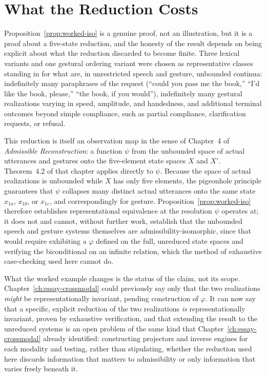 \section{What the Reduction Costs}

Proposition~\ref{prop:worked-iso} is a genuine proof, not an illustration, but it is a proof about a five-state reduction, and the honesty of the result depends on being explicit about what the reduction discarded to become finite. Three lexical variants and one gestural ordering variant were chosen as representative classes standing in for what are, in unrestricted speech and gesture, unbounded continua: indefinitely many paraphrases of the request (``could you pass me the book,'' ``I'd like the book, please,'' ``the book, if you would''), indefinitely many gestural realizations varying in speed, amplitude, and handedness, and additional terminal outcomes beyond simple compliance, such as partial compliance, clarification requests, or refusal.

This reduction is itself an observation map in the sense of Chapter~4 of \emph{Admissible Reconstruction}: a function $\psi$ from the unbounded space of actual utterances and gestures onto the five-element state spaces $X$ and $X'$. Theorem~4.2 of that chapter applies directly to $\psi$. Because the space of actual realizations is unbounded while $X$ has only five elements, the pigeonhole principle guarantees that $\psi$ collapses many distinct actual utterances onto the same state $x_{1a}$, $x_{1b}$, or $x_{1c}$, and correspondingly for gesture. Proposition~\ref{prop:worked-iso} therefore establishes representational equivalence at the resolution $\psi$ operates at; it does not and cannot, without further work, establish that the unbounded speech and gesture systems themselves are admissibility-isomorphic, since that would require exhibiting a $\varphi$ defined on the full, unreduced state spaces and verifying the biconditional on an infinite relation, which the method of exhaustive case-checking used here cannot do.

What the worked example changes is the status of the claim, not its scope. Chapter~\ref{ch:essay-crossmodal} could previously say only that the two realizations \emph{might} be representationally invariant, pending construction of $\varphi$. It can now say that a specific, explicit reduction of the two realizations \emph{is} representationally invariant, proven by exhaustive verification, and that extending the result to the unreduced systems is an open problem of the same kind that Chapter~\ref{ch:essay-crossmodal} already identified: constructing projectors and inverse engines for each modality and testing, rather than stipulating, whether the reduction used here discards information that matters to admissibility or only information that varies freely beneath it.
